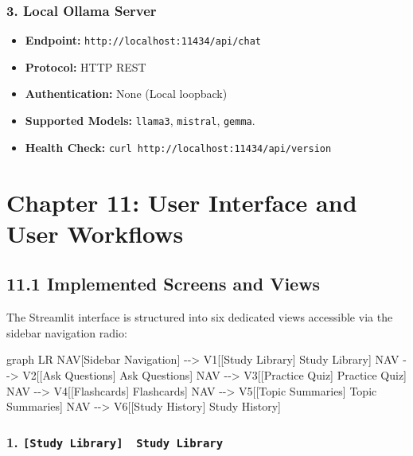 \documentclass[
]{article}
\newenvironment{Shaded}{}{}
\newcommand{\NormalTok}[1]{#1}
\providecommand{\tightlist}{%
  \setlength{\itemsep}{0pt}\setlength{\parskip}{0pt}}
\begin{document}
\subsubsection{3. Local Ollama Server}\label{local-ollama-server}

\begin{itemize}
\tightlist
\item
  \textbf{Endpoint:} \texttt{http:/\allowbreak /\allowbreak localhost:11434/\allowbreak api/\allowbreak chat}
\item
  \textbf{Protocol:} HTTP REST
\item
  \textbf{Authentication:} None (Local loopback)
\item
  \textbf{Supported Models:} \texttt{llama3}, \texttt{mistral},
  \texttt{gemma}.
\item
  \textbf{Health Check:}
  \texttt{curl\ \allowbreak http:/\allowbreak /\allowbreak localhost:11434/\allowbreak api/\allowbreak version}
\end{itemize}

\section{Chapter 11: User Interface and User
Workflows}\label{chapter-11-user-interface-and-user-workflows}

\subsection{11.1 Implemented Screens and
Views}\label{implemented-screens-and-views}

The Streamlit interface is structured into six dedicated views
accessible via the sidebar navigation radio:

\begin{Shaded}
\begin{Highlighting}[]
\NormalTok{graph LR}
\NormalTok{    NAV[Sidebar Navigation] {-}{-}\textgreater{} V1[[Study Library]  Study Library]}
\NormalTok{    NAV {-}{-}\textgreater{} V2[[Ask Questions]  Ask Questions]}
\NormalTok{    NAV {-}{-}\textgreater{} V3[[Practice Quiz]  Practice Quiz]}
\NormalTok{    NAV {-}{-}\textgreater{} V4[[Flashcards]  Flashcards]}
\NormalTok{    NAV {-}{-}\textgreater{} V5[[Topic Summaries]  Topic Summaries]}
\NormalTok{    NAV {-}{-}\textgreater{} V6[[Study History]  Study History]}
\end{Highlighting}
\end{Shaded}

\subsubsection{\texorpdfstring{1.
\texttt{{[}Study\ \allowbreak Library{]}\ \allowbreak \ \allowbreak Study\ \allowbreak Library}}{1. {[}Study Library{]}  Study Library}}\label{study-library-study-library}
\end{document}
